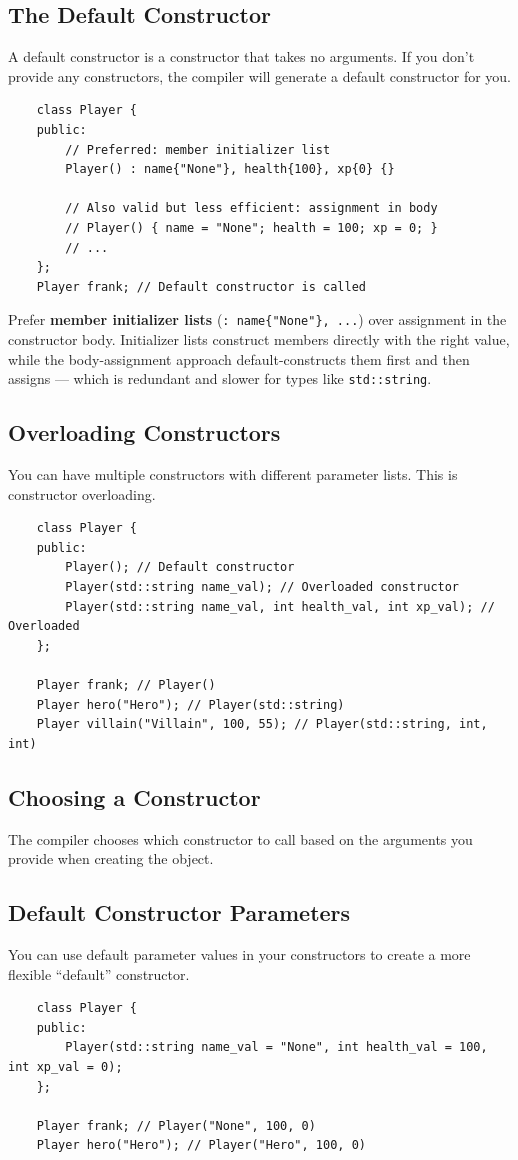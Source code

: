 \subsection{The Default Constructor}
A default constructor is a constructor that takes no arguments. If you don't provide any constructors, the compiler will generate a default constructor for you.
\begin{lstlisting}
	class Player {
	public:
		// Preferred: member initializer list
		Player() : name{"None"}, health{100}, xp{0} {}

		// Also valid but less efficient: assignment in body
		// Player() { name = "None"; health = 100; xp = 0; }
		// ...
	};
	Player frank; // Default constructor is called
\end{lstlisting}

\begin{remark}
	Prefer \textbf{member initializer lists} (\texttt{: name\{"None"\}, ...}) over assignment in the constructor body. Initializer lists construct members directly with the right value, while the body-assignment approach default-constructs them first and then assigns — which is redundant and slower for types like \texttt{std::string}.
\end{remark}

\subsection{Overloading Constructors}
You can have multiple constructors with different parameter lists. This is constructor overloading.
\begin{lstlisting}
	class Player {
	public:
		Player(); // Default constructor
		Player(std::string name_val); // Overloaded constructor
		Player(std::string name_val, int health_val, int xp_val); // Overloaded
	};

	Player frank; // Player()
	Player hero("Hero"); // Player(std::string)
	Player villain("Villain", 100, 55); // Player(std::string, int, int)
\end{lstlisting}

\subsection{Choosing a Constructor}
The compiler chooses which constructor to call based on the arguments you provide when creating the object.

\subsection{Default Constructor Parameters}
You can use default parameter values in your constructors to create a more flexible ``default'' constructor.
\begin{lstlisting}
	class Player {
	public:
		Player(std::string name_val = "None", int health_val = 100, int xp_val = 0);
	};

	Player frank; // Player("None", 100, 0)
	Player hero("Hero"); // Player("Hero", 100, 0)
\end{lstlisting}

